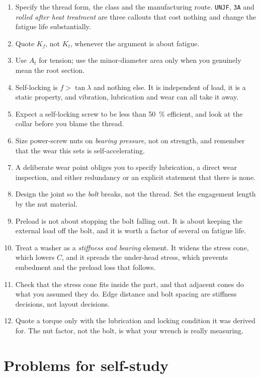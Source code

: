 \documentclass[11pt,a4paper]{article}
\begin{document}
\begin{enumerate}[nosep,leftmargin=1.5em]
  \item Specify the thread form, the class and the manufacturing route. \texttt{UNJF}, \texttt{3A} and
        \emph{rolled after heat treatment} are three callouts that cost nothing and change the fatigue
        life substantially.
  \item Quote $K_f$, not $K_t$, whenever the argument is about fatigue.
  \item Use $A_t$ for tension; use the minor-diameter area only when you genuinely mean the root
        section.
  \item Self-locking is $f > \tan\lambda$ and nothing else. It is independent of load, it is a static
        property, and vibration, lubrication and wear can all take it away.
  \item Expect a self-locking screw to be less than \SI{50}{\percent} efficient, and look at the collar
        before you blame the thread.
  \item Size power-screw nuts on \emph{bearing pressure}, not on strength, and remember that the wear
        this sets is self-accelerating.
  \item A deliberate wear point obliges you to specify lubrication, a direct wear inspection, and
        either redundancy or an explicit statement that there is none.
  \item Design the joint so the \emph{bolt} breaks, not the thread. Set the engagement length by the
        nut material.
  \item Preload is not about stopping the bolt falling out. It is about keeping the external load off
        the bolt, and it is worth a factor of several on fatigue life.
  \item Treat a washer as a \emph{stiffness and bearing} element. It widens the stress cone, which
        lowers $C$, and it spreads the under-head stress, which prevents embedment and the preload
        loss that follows.
  \item Check that the stress cone fits inside the part, and that adjacent cones do what you assumed
        they do. Edge distance and bolt spacing are stiffness decisions, not layout decisions.
  \item Quote a torque only with the lubrication and locking condition it was derived for. The nut
        factor, not the bolt, is what your wrench is really measuring.
\end{enumerate}

\section{Problems for self-study}
\end{document}
